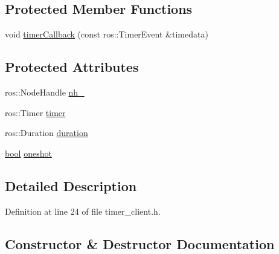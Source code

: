 \subsection*{Protected Member Functions}
\begin{DoxyCompactItemize}
\item 
void \hyperlink{classros__timer__client_1_1SmaccTimerClient_ab6a461bedfad7a1842d27249008cae4d}{timer\+Callback} (const ros\+::\+Timer\+Event \&timedata)
\end{DoxyCompactItemize}
\subsection*{Protected Attributes}
\begin{DoxyCompactItemize}
\item 
ros\+::\+Node\+Handle \hyperlink{classros__timer__client_1_1SmaccTimerClient_a34ff27bc5f75446dfc8128bfeabce3fc}{nh\+\_\+}
\item 
ros\+::\+Timer \hyperlink{classros__timer__client_1_1SmaccTimerClient_a950dfb5b2a2c699d2f260b1acda4fd93}{timer}
\item 
ros\+::\+Duration \hyperlink{classros__timer__client_1_1SmaccTimerClient_afa4e91d5da885c59306d74c7b6e85052}{duration}
\item 
\hyperlink{classbool}{bool} \hyperlink{classros__timer__client_1_1SmaccTimerClient_a34bff666381b2a35860a7cf9ab6427e9}{oneshot}
\end{DoxyCompactItemize}


\subsection{Detailed Description}


Definition at line 24 of file timer\+\_\+client.\+h.



\subsection{Constructor \& Destructor Documentation}
